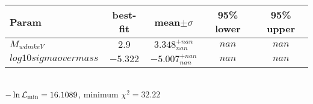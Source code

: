 \begin{tabular}{|l|c|c|c|c|} 
 \hline 
Param & best-fit & mean$\pm\sigma$ & 95\% lower & 95\% upper \\ \hline 
$M_{wdm keV }$ &$2.9$ & $3.348_{nan}^{+nan}$ & $nan$ & $nan$ \\ 
$log10sigmaovermass$ &$-5.322$ & $-5.007_{nan}^{+nan}$ & $nan$ & $nan$ \\ 
\hline 
 \end{tabular} \\ 
$-\ln{\cal L}_\mathrm{min} =16.1089$, minimum $\chi^2=32.22$ \\ 
